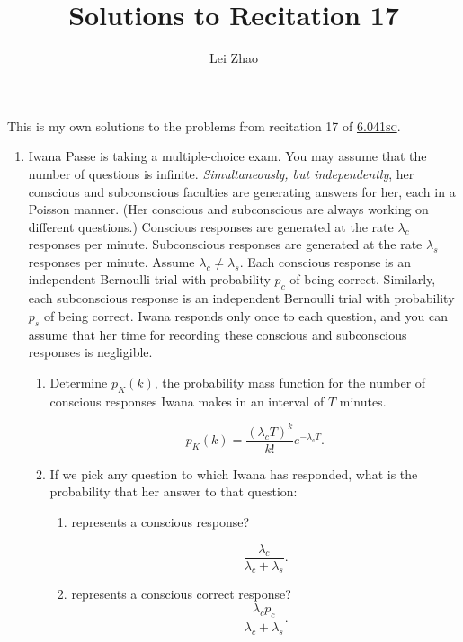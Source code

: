 

\title{Solutions to Recitation 17}
\author{Lei Zhao}



\maketitle

This is my own solutions to the problems from recitation 17 of
\href{https://ocw.mit.edu/courses/electrical-engineering-and-computer-science/6-041sc-probabilistic-systems-analysis-and-applied-probability-fall-2013/unit-iii/lecture-15/}{6.041\textsc{sc}}.

\begin{enumerate}
\item Iwana Passe is taking a multiple-choice exam.  You may assume that the
  number of questions is infinite.  \emph{Simultaneously, but independently}, her
  conscious and subconscious faculties are generating answers for her, each
  in a Poisson manner.  (Her conscious and subconscious are always working
  on different questions.)  Conscious responses are generated at the rate
  \(λ_c\) responses per minute.  Subconscious responses are generated at the
  rate \(λ_s\) responses per minute.  Assume \(λ_c \ne λ_s\).  Each
  conscious response is an independent Bernoulli trial with probability
  \(p_c\) of being correct.  Similarly, each subconscious response is an
  independent Bernoulli trial with probability \(p_s\) of being correct.
  Iwana responds only once to each question, and you can assume that her
  time for recording these conscious and subconscious responses is
  negligible.
  \begin{enumerate} \parasp
  \item Determine \(p_K(k)\), the probability mass function for the number
    of conscious responses Iwana makes in an interval of \(T\) minutes.

    \[p_K(k) = \frac{(\lambda_c T)^k}{k!} e^{-\lambda_c T}.\]

  \item If we pick any question to which Iwana has responded, what is the
    probability that her answer to that question:
    \begin{enumerate} \parasp
    \item represents a conscious response?

      \[\frac{\lambda_c}{\lambda_c + \lambda_s}.\]

    \item represents a conscious correct response?
      \[\frac{\lambda_c p_c}{\lambda_c + \lambda_s}.\]
    \end{enumerate}


\end{enumerate}
\end{enumerate}
